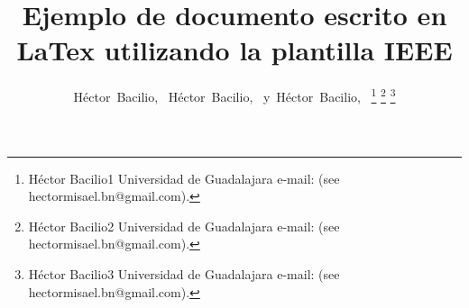 \documentclass[journal]{IEEEtran}
\begin{document}
%
\title{Ejemplo de documento escrito en LaTex utilizando la plantilla IEEE}
%
%
%

\author{Héctor~Bacilio,~
        Héctor~Bacilio,~
        y~Héctor~Bacilio,~%
\thanks{Héctor Bacilio1 Universidad de Guadalajara
 e-mail: (see hectormisael.bn@gmail.com).}%
\thanks{Héctor Bacilio2 Universidad de Guadalajara
 e-mail: (see hectormisael.bn@gmail.com).}%
\thanks{Héctor Bacilio3 Universidad de Guadalajara
 e-mail: (see hectormisael.bn@gmail.com).}}

% 
%
\end{document}
